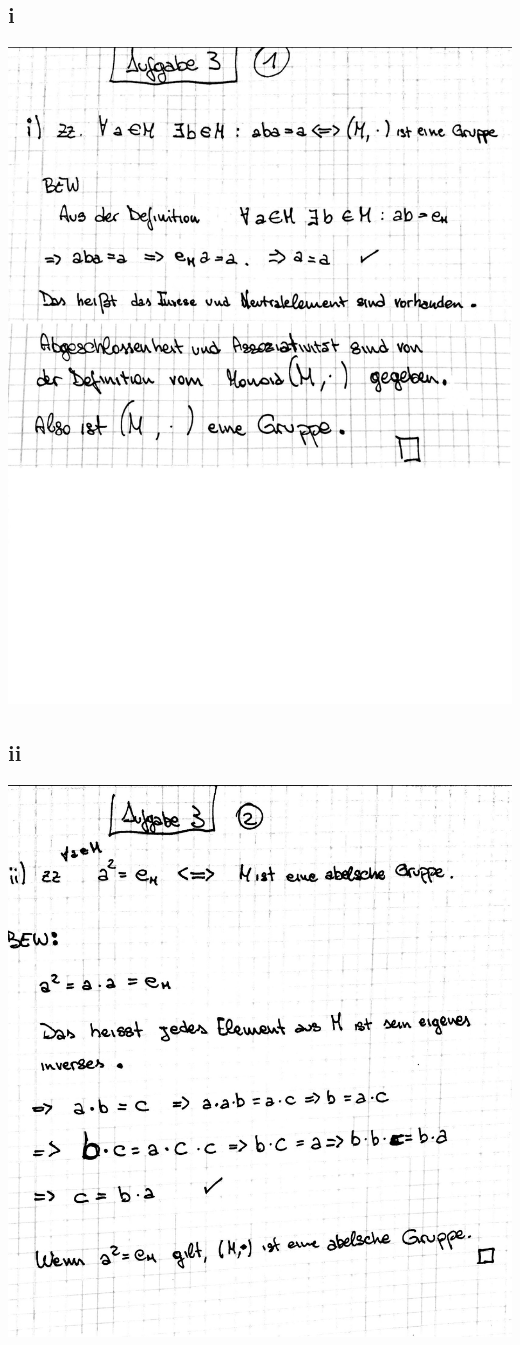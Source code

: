 \documentclass[10pt,a4paper]{article}
\begin{document}
\subsection{i}
\includegraphics[width=\textwidth]{lat5b_10.jpg} 
\subsection{ii}
\includegraphics[width=\textwidth]{lat5b_11.jpg} 
\end{document}
